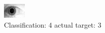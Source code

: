 \begin{figure}[h!]
\begin{center}
\includegraphics[width=0.60\columnwidth]{figures/ID1943_class_4_target_3.png}
\end{center}
\caption{ Classification: 4 actual target: 3}
\label{fig:ID1943_class_4_target_3}
\end{figure}
